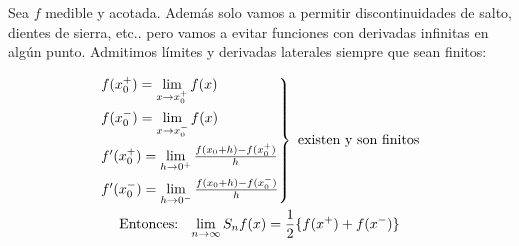 	\begin{theorem} \label{thm:Dirichlet2}
		$ $ %

		Sea $f$ medible y acotada. Además solo vamos a permitir discontinuidades de salto, dientes de sierra, etc.. pero vamos a evitar funciones con derivadas infinitas en algún punto. Admitimos límites y derivadas laterales siempre que sean finitos:

			\label{fig:FuncionesDirichlet}

		\begin{gather*}
		\begin{rcases}
			f(x_0^+) = \lim\limits_{x \to x_0^+} f(x) \\
			f(x_0^-) = \lim\limits_{x \to x_0^-} f(x) \\
			f'(x_0^+) = \lim\limits_{h \to 0^+} \frac{f(x_0+h)-f(x_0^+)}{h} \\
			f'(x_0^-) = \lim\limits_{h \to 0^-} \frac{f(x_0+h)-f(x_0^-)}{h}
		\end{rcases} \text{ existen y son finitos}\\
		\text{Entonces: } \ \lim_{n \to \infty} S_nf(x) = \frac{1}{2} \{f(x^+)+f(x^-)\}
		\end{gather*}

	\end{theorem}

